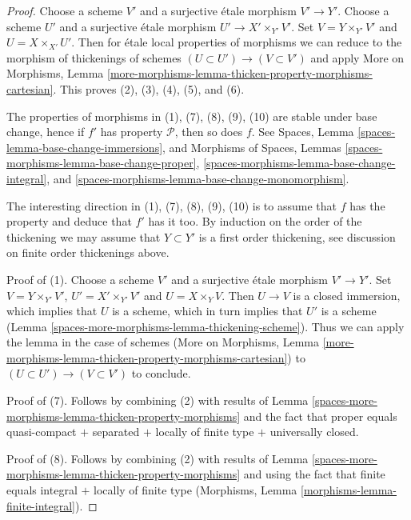 \begin{proof}
Choose a scheme $V'$ and a surjective \'etale morphism $V' \to Y'$.
Choose a scheme $U'$ and a surjective \'etale morphism
$U' \to X' \times_{Y'} V'$. Set $V = Y \times_{Y'} V'$ and
$U = X \times_{X'} U'$. Then for \'etale local properties of morphisms
we can reduce to the morphism of thickenings of schemes
$(U \subset U') \to (V \subset V')$ and apply More on Morphisms, Lemma
\ref{more-morphisms-lemma-thicken-property-morphisms-cartesian}.
This proves (2), (3), (4), (5), and (6).

\medskip\noindent
The properties of morphisms in (1), (7), (8), (9), (10) are stable
under base change, hence if $f'$ has property $\mathcal{P}$, then so
does $f$. See
Spaces, Lemma \ref{spaces-lemma-base-change-immersions},
and
Morphisms of Spaces, Lemmas
\ref{spaces-morphisms-lemma-base-change-proper},
\ref{spaces-morphisms-lemma-base-change-integral}, and
\ref{spaces-morphisms-lemma-base-change-monomorphism}.

\medskip\noindent
The interesting direction in (1), (7), (8), (9), (10) is to assume
that $f$ has the property and deduce that $f'$ has it too.
By induction on the order of the thickening we may
assume that $Y \subset Y'$ is a first order thickening, see
discussion on finite order thickenings above.

\medskip\noindent
Proof of (1). Choose a scheme $V'$ and a surjective \'etale morphism
$V' \to Y'$. Set $V = Y \times_{Y'} V'$, $U' = X' \times_{Y'} V'$
and $U = X \times_Y V$. Then $U \to V$ is a closed immersion, which
implies that $U$ is a scheme, which in turn implies that $U'$ is
a scheme (Lemma \ref{spaces-more-morphisms-lemma-thickening-scheme}). Thus we can apply
the lemma in the case of schemes
(More on Morphisms, Lemma
\ref{more-morphisms-lemma-thicken-property-morphisms-cartesian})
to $(U \subset U') \to (V \subset V')$ to conclude.

\medskip\noindent
Proof of (7). Follows by combining (2) with
results of Lemma \ref{spaces-more-morphisms-lemma-thicken-property-morphisms}
and the fact that proper equals quasi-compact $+$
separated $+$ locally of finite type $+$ universally closed.

\medskip\noindent
Proof of (8). Follows by combining (2) with
results of Lemma \ref{spaces-more-morphisms-lemma-thicken-property-morphisms}
and using the fact that finite equals integral $+$ locally
of finite type (Morphisms, Lemma \ref{morphisms-lemma-finite-integral}).


\end{proof}
